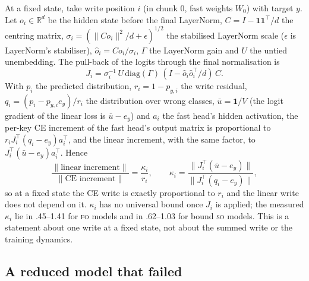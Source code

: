 \documentclass[11pt]{article}
\newcommand{\FO}{\textsc{fo}}
\newcommand{\SO}{\textsc{so}}
\begin{document}
At a fixed state, take write position $i$ (in chunk 0, fast weights $W_0$) with target $y$. Let
$o_i\in\mathbb R^d$ be the hidden state before the final LayerNorm, $C=I-\mathbf 1\mathbf 1^\top/d$ the
centring matrix, $\sigma_i=(\lVert Co_i\rVert^2/d+\epsilon)^{1/2}$ the stabilised LayerNorm scale
($\epsilon$ is LayerNorm's stabiliser), $\hat o_i=Co_i/\sigma_i$, $\Gamma$ the LayerNorm gain and $U$
the untied unembedding. The pull-back of the logits through the final normalisation is
\begin{equation*}
  J_i=\sigma_i^{-1}\,U\,\mathrm{diag}(\Gamma)\,(I-\hat o_i\hat o_i^\top/d)\,C .
\end{equation*}
With $p_i$ the predicted distribution, $r_i=1-p_{y,i}$ the write residual, $q_i=(p_i-p_{y,i}e_y)/r_i$
the distribution over wrong classes, $\bar u=\mathbf 1/V$ (the logit gradient of the linear loss is
$\bar u-e_y$) and $a_i$ the fast head's hidden activation, the per-key CE increment of the fast head's
output matrix is proportional to $r_iJ_i^\top(q_i-e_y)a_i^\top$, and the linear increment, with the
same factor, to $J_i^\top(\bar u-e_y)a_i^\top$. Hence
\begin{equation*}
  \frac{\lVert\text{linear increment}\rVert}{\lVert\text{CE increment}\rVert}=\frac{\kappa_i}{r_i},
  \qquad
  \kappa_i=\frac{\lVert J_i^\top(\bar u-e_y)\rVert}{\lVert J_i^\top(q_i-e_y)\rVert},
\end{equation*}
so at a fixed state the CE write is exactly proportional to $r_i$ and the linear write does not depend
on it. $\kappa_i$ has no universal bound once $J_i$ is applied; the measured $\kappa_i$ lie in
.45--1.41 for \FO{} models and in .62--1.03 for bound \SO{} models. This is a statement about one
write at a fixed state, not about the summed write or the training dynamics.

\subsection{A reduced model that failed}
\end{document}
